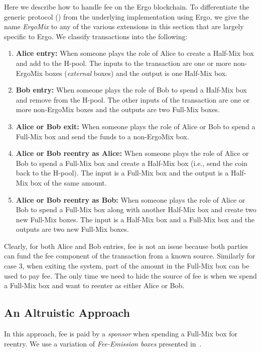 \documentclass[runningheads]{llncs}
\newcommand{\mixname}{ErgoMix\xspace}
\begin{document}
Here we describe how to handle fee on the Ergo blockchain. To differentiate the generic protocol (\algname) from the underlying implementation using Ergo, we give the name {\em \mixname} to any of the various extensions in this section that are largely specific to Ergo. 
We classify \algname transactions into the following:

\begin{enumerate}
    \item \textbf{Alice entry:} When someone plays the role of Alice to create a Half-Mix box and add to the H-pool. The inputs to the transaction are one or more non-\mixname boxes ({\em external} boxes) and the output is one Half-Mix box. 
    \item \textbf{Bob entry:} When someone plays the role of Bob to spend a Half-Mix box and remove from the H-pool. The other inputs of the transaction are one or more non-\mixname boxes and the outputs are two Full-Mix boxes. 
    \item \textbf{Alice or Bob exit:} When someone plays the role of Alice or Bob to spend a Full-Mix box and send the funds to a non-\mixname box. 
    \item \textbf{Alice or Bob reentry as Alice:} When someone plays the role of Alice or Bob to spend a Full-Mix box and create a Half-Mix box (i.e., send the coin back to the H-pool). The input is a Full-Mix box and the output is a Half-Mix box of the same amount.
    \item \textbf{Alice or Bob reentry as Bob:} When someone plays the role of Alice or Bob to spend a Full-Mix box along with another Half-Mix box and create two new Full-Mix boxes. The input is a Half-Mix box and a Full-Mix box and the outputs are two new Full-Mix boxes.
\end{enumerate}

Clearly, for both Alice and Bob entries, fee is not an issue because both parties can fund the fee component of the transaction from a known source. Similarly for case 3, when exiting the system, part of the amount in the Full-Mix box can be used to pay fee. The only time we need to hide the source of fee is when we spend a Full-Mix box and want to reenter as either Alice or Bob. 

\subsection{An Altruistic Approach}
\label{donation}

In this approach, fee is paid by a {\em sponsor} when spending a Full-Mix box for reentry. 
We use a variation of {\em Fee-Emission boxes} presented in~\cite{Fee-Emission}. 
\end{document}
